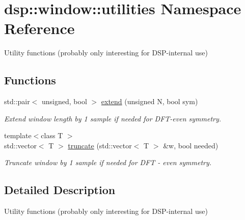\hypertarget{namespacedsp_1_1window_1_1utilities}{}\section{dsp\+:\+:window\+:\+:utilities Namespace Reference}
\label{namespacedsp_1_1window_1_1utilities}


Utility functions (probably only interesting for D\+S\+P-\/internal use)  


\subsection*{Functions}
\begin{DoxyCompactItemize}
\item 
\mbox{\label{namespacedsp_1_1window_1_1utilities_a6606a054ce5c194c8f3a087bbcda4bdb}} 
std\+::pair$<$ unsigned, bool $>$ \mbox{\hyperlink{namespacedsp_1_1window_1_1utilities_a6606a054ce5c194c8f3a087bbcda4bdb}{extend}} (unsigned N, bool sym)
\begin{DoxyCompactList}\small\item\em Extend window length by 1 sample if needed for D\+F\+T-\/even symmetry. \end{DoxyCompactList}\item 
\mbox{\label{namespacedsp_1_1window_1_1utilities_af2d4623e290580897aec3b579b665015}} 
{\footnotesize template$<$class T $>$ }\\std\+::vector$<$ T $>$ \mbox{\hyperlink{namespacedsp_1_1window_1_1utilities_af2d4623e290580897aec3b579b665015}{truncate}} (std\+::vector$<$ T $>$ \&w, bool needed)
\begin{DoxyCompactList}\small\item\em Truncate window by 1 sample if needed for D\+FT -\/ even symmetry. \end{DoxyCompactList}\end{DoxyCompactItemize}


\subsection{Detailed Description}
Utility functions (probably only interesting for D\+S\+P-\/internal use) 
